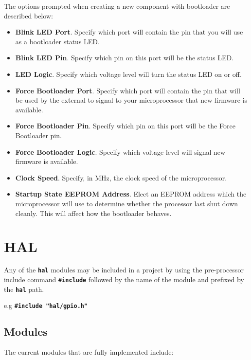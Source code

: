 \documentclass[a4paper, oneside, 11pt, titlepage, onecolumn, openright]{article}
\begin{document}
The options prompted when creating a new component with bootloader are described below:
\begin{itemize}

\item \textbf{Blink LED Port}. Specify which port will contain the pin that you will use as a bootloader status LED.

\item \textbf{Blink LED Pin}. Specify which pin on this port will be the status LED.

\item \textbf{LED Logic}. Specify which voltage level will turn the status LED on or off.

\item \textbf{Force Bootloader Port}. Specify which port will contain the pin that will be used by the external to signal to your microprocessor that new firmware is available.

\item \textbf{Force Bootloader Pin}. Specify which pin on this port will be the Force Bootloader pin.


\item \textbf{Force Bootloader Logic}. Specify which voltage level will signal new firmware is available.

\item \textbf{Clock Speed}. Specify, in MHz, the clock speed of the microprocessor.

\item \textbf{Startup State EEPROM Address}. Elect an EEPROM address which the microprocessor will use to determine whether the processor last shut down cleanly. This will affect how the bootloader behaves.

\end{itemize}

\section{HAL}
			\label{s:HAL}
			
			Any of the \textbf{\texttt{hal}} modules may be included in a project by using the pre-processor include command \textbf{\texttt{\#include}} followed by the name of the module and prefixed by the \textbf{\texttt{hal}} path.
			
			e.g \textbf{\texttt{\#include "hal/gpio.h"}}
			
\subsection{Modules}
			\label{ss:HALModules}
			The current modules that are fully implemented include:
			
\end{document}
